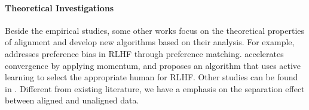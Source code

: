 \vspace{-0.1in}
\paragraph{Theoretical Investigations} Beside the empirical studies, some other works focus on the theoretical properties of alignment and develop new algorithms based on their analysis. For example, \cite{xiao2024algorithmic} addresses preference bias in RLHF through preference matching. \cite{he2024accelerated} accelerates convergence by applying momentum, and \cite{liu2024dual} proposes an algorithm that uses active learning to select the appropriate human for RLHF. 
Other studies can be found in \cite{wang2024magnetic,xiong2024iterative,wang2023rlhf,du2024exploration}.
Different from existing literature, we have a emphasis on the separation effect between aligned and unaligned data. 


